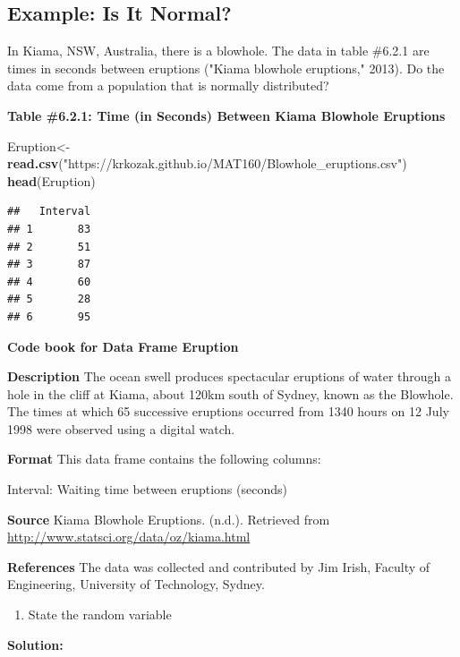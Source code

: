 \documentclass[]{book}
\newenvironment{Shaded}{\begin{snugshade}}{\end{snugshade}}
\newcommand{\KeywordTok}[1]{\textcolor[rgb]{0.13,0.29,0.53}{\textbf{#1}}}
\newcommand{\NormalTok}[1]{#1}
\newcommand{\StringTok}[1]{\textcolor[rgb]{0.31,0.60,0.02}{#1}}
\providecommand{\tightlist}{%
  \setlength{\itemsep}{0pt}\setlength{\parskip}{0pt}}
\begin{document}
\hypertarget{example-is-it-normal}{%
\subsection{Example: Is It Normal?}\label{example-is-it-normal}}

In Kiama, NSW, Australia, there is a blowhole. The data in table \#6.2.1 are times in seconds between eruptions ("Kiama blowhole eruptions," 2013). Do the data come from a population that is normally distributed?

\textbf{Table \#6.2.1: Time (in Seconds) Between Kiama Blowhole Eruptions }

\begin{Shaded}
\begin{Highlighting}[]
\NormalTok{Eruption<-}\KeywordTok{read.csv}\NormalTok{(}\StringTok{"https://krkozak.github.io/MAT160/Blowhole_eruptions.csv"}\NormalTok{)}
\KeywordTok{head}\NormalTok{(Eruption)}
\end{Highlighting}
\end{Shaded}

\begin{verbatim}
##   Interval
## 1       83
## 2       51
## 3       87
## 4       60
## 5       28
## 6       95
\end{verbatim}

\textbf{Code book for Data Frame Eruption}

\textbf{Description}
The ocean swell produces spectacular eruptions of water through a hole in the cliff at Kiama, about 120km south of Sydney, known as the Blowhole. The times at which 65 successive eruptions occurred from 1340 hours on 12 July 1998 were observed using a digital watch.

\textbf{Format}
This data frame contains the following columns:

Interval: Waiting time between eruptions (seconds)

\textbf{Source}
Kiama Blowhole Eruptions. (n.d.). Retrieved from \url{http://www.statsci.org/data/oz/kiama.html}

\textbf{References}
The data was collected and contributed by Jim Irish, Faculty of Engineering, University of Technology, Sydney.

\begin{enumerate}
\def\labelenumi{\alph{enumi}.}
\tightlist
\item
  State the random variable
\end{enumerate}

\textbf{Solution:}
\end{document}
